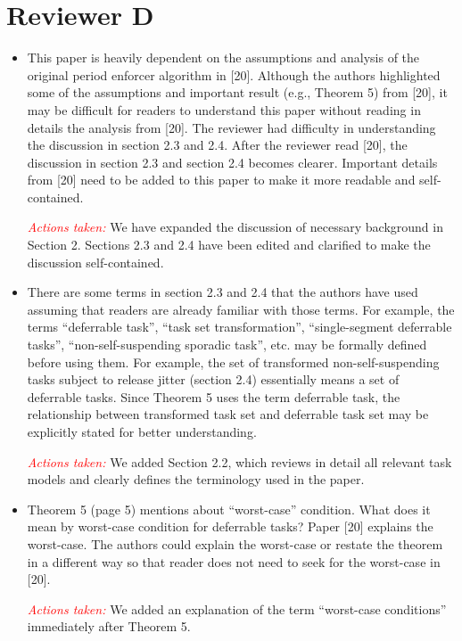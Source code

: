 \documentclass[12pt]{article}
\newcommand{\action}[1]{\textcolor{red}{\emph{\it Actions taken: }}{\color{blue}#1}\medskip}
\begin{document}
\section*{Reviewer D}


\begin{itemize}
	\item   
This paper is heavily dependent on the assumptions and analysis of the
original period enforcer algorithm in [20]. Although the authors highlighted
some of the assumptions and important result (e.g., Theorem 5) from [20], it
may be difficult for readers to understand this paper without reading in
details the analysis from [20]. The reviewer had difficulty in understanding
the discussion in section 2.3 and 2.4. After the reviewer read [20], the
discussion in section 2.3 and section 2.4 becomes clearer. Important details
from [20] need to be added to this paper to make it more readable and
self-contained.

\action{We have expanded the discussion of necessary background in Section 2. Sections 2.3 and 2.4 have been edited and clarified to make the discussion self-contained.}

	\item   
There are some terms in section 2.3 and 2.4 that the authors have used
assuming that readers are already familiar with those terms. For example,
the terms “deferrable task”, “task set transformation”,
“single-segment deferrable tasks”, “non-self-suspending sporadic
task”, etc. may be formally defined before using them. For example, the
set of transformed non-self-suspending tasks subject to release jitter
(section 2.4) essentially means a set of deferrable tasks. Since Theorem 5
uses the term deferrable task, the relationship between transformed task set
and deferrable task set may be explicitly stated for better understanding. 

\action{We added Section 2.2, which reviews in detail all relevant task models  and clearly defines the terminology used in the paper.}
	



	\item   
Theorem 5 (page 5) mentions about “worst-case” condition. What does it
mean by worst-case condition for deferrable tasks? Paper [20] explains the
worst-case. The authors could explain the worst-case or restate the theorem
in a different way so that reader does not need to seek for the worst-case
in [20].   

\action{We added an explanation of the term ``worst-case conditions'' immediately after Theorem 5.}


\end{itemize}
\end{document}
